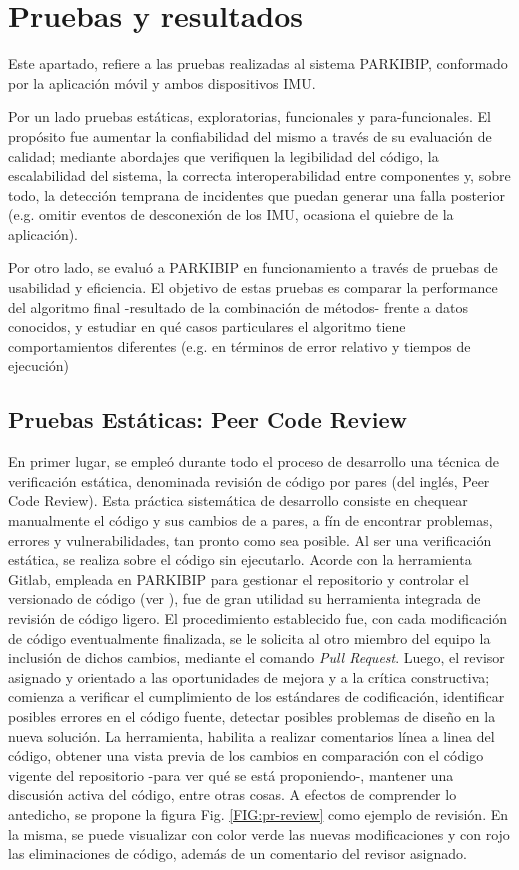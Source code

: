 \chapter{Pruebas y resultados} \label{chap:test_results}

Este apartado, refiere a las pruebas realizadas al sistema PARKIBIP, conformado por la aplicación móvil y ambos dispositivos IMU. 

Por un lado pruebas estáticas, exploratorias, funcionales y para-funcionales. El propósito fue aumentar la confiabilidad del mismo a través de su evaluación de calidad; mediante abordajes que verifiquen la legibilidad del código, la escalabilidad del sistema, la correcta interoperabilidad entre componentes y, sobre todo, la detección temprana de incidentes que puedan generar una falla posterior (e.g. omitir eventos de desconexión de los IMU, ocasiona el quiebre de la aplicación).

Por otro lado, se evaluó a PARKIBIP en funcionamiento a través de pruebas de usabilidad y eficiencia. El objetivo de estas pruebas es comparar la performance del algoritmo final -resultado de la combinación de métodos- frente a datos conocidos, y estudiar en qué casos particulares el algoritmo tiene comportamientos diferentes (e.g. en términos de error relativo y tiempos de ejecución)

\section{Pruebas Estáticas: Peer Code Review}

En primer lugar, se empleó durante todo el proceso de desarrollo una técnica de verificación estática, denominada revisión de código por pares (del inglés, Peer Code Review). Esta práctica sistemática de desarrollo consiste en chequear manualmente el código y sus cambios de a pares, a fín de  encontrar problemas, errores y vulnerabilidades, tan pronto como sea posible. Al ser una verificación estática, se realiza sobre el código sin ejecutarlo. 
\noindent Acorde con la herramienta Gitlab, empleada en PARKIBIP para gestionar el repositorio y controlar el versionado de código (ver ), fue de gran utilidad su herramienta integrada de revisión de código ligero. El procedimiento establecido fue, con cada modificación de código eventualmente finalizada, se le solicita al otro miembro del equipo la inclusión de dichos cambios, mediante el comando \textit{Pull Request}. Luego, el revisor asignado y orientado a las oportunidades de mejora y a la crítica constructiva; comienza a verificar el cumplimiento de los estándares de codificación, identificar posibles errores en el código fuente, detectar posibles problemas de diseño en la nueva solución. La herramienta, habilita a realizar comentarios línea a linea del código, obtener una vista previa de los cambios en comparación con el código vigente del repositorio -para ver qué se está proponiendo-, mantener una discusión activa del código, entre otras cosas. A efectos de comprender lo antedicho, se propone la figura Fig. \ref{FIG:pr-review} como ejemplo de revisión. En la misma, se puede visualizar con color verde las nuevas modificaciones y con rojo las eliminaciones de código, además de un comentario del revisor asignado.

